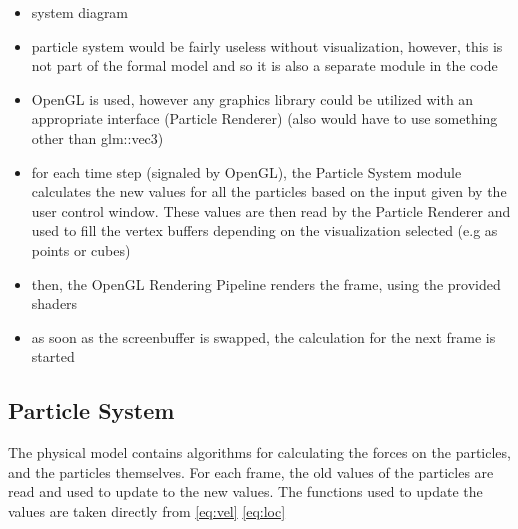 \documentclass[runningheads,a4paper]{llncs}
\begin{document}
\begin{itemize}
\item system diagram
\item particle system would be fairly useless without visualization, however, this is not part of the formal model and so it is also a separate module in the code
\item OpenGL is used, however any graphics library could be utilized with an appropriate interface (Particle Renderer) (also would have to use something other than glm::vec3)
\item for each time step (signaled by OpenGL), the Particle System module calculates the new values for all the particles based on the input given by the user control window. These values are then read by the Particle Renderer and used to fill the vertex buffers depending on the visualization selected (e.g as points or cubes)
\item then, the OpenGL Rendering Pipeline renders the frame, using the provided shaders
\item as soon as the screenbuffer is swapped, the calculation for the next frame is started
\end{itemize}

\subsection{Particle System}
The physical model contains algorithms for calculating the forces on the particles, and the particles themselves. For each frame, the old values of the particles are read and used to update to the new values. The functions used to update the values are taken directly from \ref{eq:vel} \ref{eq:loc}
\end{document}
